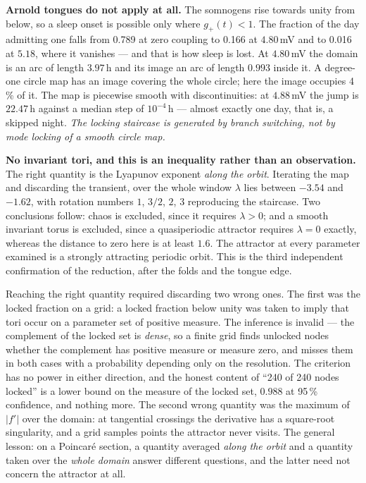 \textbf{Arnold tongues do not apply at all.} The somnogens rise towards unity from below, so a sleep onset is possible only where $g_+(t)<1$. The fraction of the day admitting one falls from 0.789 at zero coupling to 0.166 at $4.80$\,mV and to 0.016 at $5.18$, where it vanishes --- and that is how sleep is lost. At $4.80$\,mV the domain is an arc of length $3.97$\,h and its image an arc of length $0.993$ inside it. A degree-one circle map has an image covering the whole circle; here the image occupies 4\,\% of it. The map is piecewise smooth with discontinuities: at $4.88$\,mV the jump is $22.47$\,h against a median step of $10^{-4}$\,h --- almost exactly one day, that is, a skipped night. \emph{The locking staircase is generated by branch switching, not by mode locking of a smooth circle map.}

\textbf{No invariant tori, and this is an inequality rather than an observation.} The right quantity is the Lyapunov exponent \emph{along the orbit}. Iterating the map and discarding the transient, over the whole window $\lambda$ lies between $-3.54$ and $-1.62$, with rotation numbers $1$, $3/2$, $2$, $3$ reproducing the staircase. Two conclusions follow: chaos is excluded, since it requires $\lambda>0$; and a smooth invariant torus is excluded, since a quasiperiodic attractor requires $\lambda=0$ exactly, whereas the distance to zero here is at least $1.6$. The attractor at every parameter examined is a strongly attracting periodic orbit. This is the third independent confirmation of the reduction, after the folds and the tongue edge.

\begin{note}
Reaching the right quantity required discarding two wrong ones. The first was the locked fraction on a grid: a locked fraction below unity was taken to imply that tori occur on a parameter set of positive measure. The inference is invalid --- the complement of the locked set is \emph{dense}, so a finite grid finds unlocked nodes whether the complement has positive measure or measure zero, and misses them in both cases with a probability depending only on the resolution. The criterion has no power in either direction, and the honest content of ``240 of 240 nodes locked'' is a lower bound on the measure of the locked set, $0.988$ at 95\,\% confidence, and nothing more. The second wrong quantity was the maximum of $|f'|$ over the domain: at tangential crossings the derivative has a square-root singularity, and a grid samples points the attractor never visits. The general lesson: on a Poincar\'e section, a quantity averaged \emph{along the orbit} and a quantity taken over the \emph{whole domain} answer different questions, and the latter need not concern the attractor at all.
\end{note}


